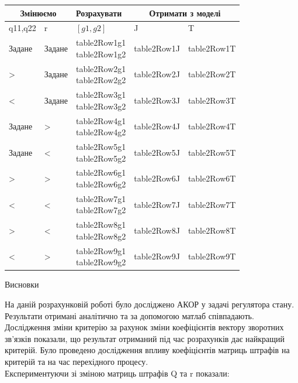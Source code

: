 \documentclass[a4paper]{article}
\begin{document}
\begin{center}
\begin{tabular}{ |p{3cm}||p{3cm}||p{3cm}||p{3cm}||p{3cm}| }
 \hline
 \multicolumn{2}{|c|}{Змінюємо} & Розрахувати & \multicolumn{2}{|c|}{Отримати з моделі}\\
 \hline
 q11,q22 & r & $[g1,g2]$ & J & T\\
 \hline
 Задане & Задане & \makecell{ {{table2Row1g1}} \\ {{table2Row1g2}} } & {{table2Row1J}} & {{table2Row1T}} \\
 > & Задане & \makecell{ {{table2Row2g1}} \\ {{table2Row2g2}} } & {{table2Row2J}} & {{table2Row2T}} \\
 < & Задане & \makecell{ {{table2Row3g1}} \\ {{table2Row3g2}} } & {{table2Row3J}} & {{table2Row3T}} \\
 Задане & > & \makecell{ {{table2Row4g1}} \\ {{table2Row4g2}} } & {{table2Row4J}} & {{table2Row4T}} \\
 Задане & < & \makecell{ {{table2Row5g1}} \\ {{table2Row5g2}} } & {{table2Row5J}} & {{table2Row5T}} \\
 > & > & \makecell{ {{table2Row6g1}} \\ {{table2Row6g2}} } & {{table2Row6J}} & {{table2Row6T}} \\
 < & < & \makecell{ {{table2Row7g1}} \\ {{table2Row7g2}} } & {{table2Row7J}} & {{table2Row7T}} \\
 > & < & \makecell{ {{table2Row8g1}} \\ {{table2Row8g2}} } & {{table2Row8J}} & {{table2Row8T}} \\
 < & > & \makecell{ {{table2Row9g1}} \\ {{table2Row9g2}} } & {{table2Row9J}} & {{table2Row9T}} \\
 \hline
\end{tabular}
\end{center}

\begin{center}
Висновки \\
\end{center}

\indent На даній розрахунковій роботі було досліджено АКОР у задачі
регулятора стану. Результати отримані аналітично та за допомогою
матлаб співпадають. Дослідження зміни критерію за рахунок зміни
коефіцієнтів вектору зворотних зв’язків показали, що результат
отриманий під час розрахунків дає найкращий критерій. Було
проведено дослідження впливу коефіцієнтів матриць штрафів на
критерій та на час перехідного процесу. \\
\indent Експериментуючи зі зміною матриць штрафів Q та r показали:
\end{document}
